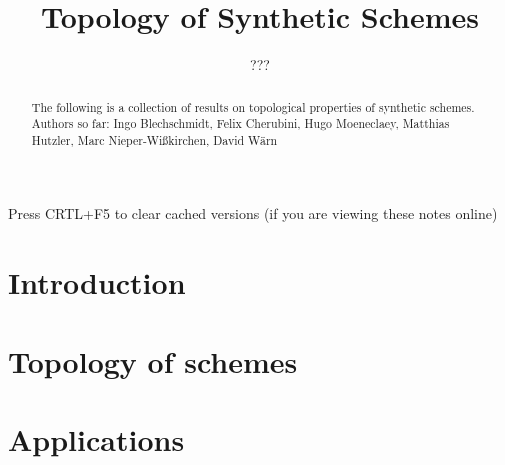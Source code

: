 \documentclass{../util/zariski}
\title{Topology of Synthetic Schemes}
\author{???}
\begin{document}
\maketitle

\begin{center}
  \color{purple}
  \large{Press CRTL+F5 to clear cached versions}
  \large{(if you are viewing these notes online)}
\end{center}

\begin{abstract}
  The following is a collection of results on topological properties of synthetic schemes.
  Authors so far: Ingo Blechschmidt, Felix Cherubini, Hugo Moeneclaey, Matthias Hutzler, Marc Nieper-Wißkirchen, David Wärn
\end{abstract}

\tableofcontents

\section*{Introduction}


\section{Topology of schemes}


\section{Applications}


\printindex

\printbibliography
\end{document}
